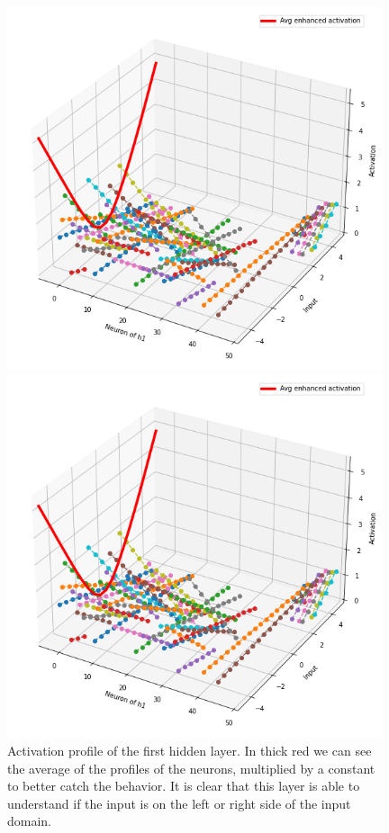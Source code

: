 \begin{figure}[h]
    \centering
    \begin{minipage}[t]{0.48\textwidth}
        \centering
        \includegraphics[width=0.98\textwidth]{Images/reg_h1.png}
        \caption{Activation profile of the first hidden layer. In thick red we can see the average of the profiles of the 
            neurons, multiplied by a constant to better catch the behavior. It is clear that this layer is able to understand
            if the input is on the left or right side of the input domain.}
        \label{fig:reg_h1}
    \end{minipage}\hfill
    \begin{minipage}[t]{0.48\textwidth}
        \centering
        \includegraphics[width=0.98\textwidth]{Images/reg_h1.png}

\end{minipage}
\end{figure}
